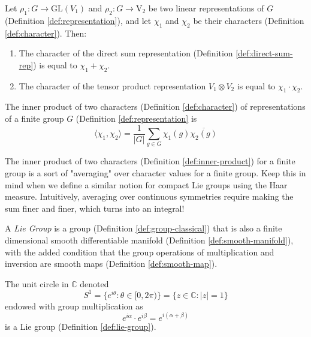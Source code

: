 \begin{proposition}
  Let $\rho_1 : G \to \mathrm{GL}(V_1)$ and $\rho_2 : G \to \mathrm{V_2}$ be two linear representations of $G$ (Definition \ref{def:representation}), and let $\chi_1$ and $\chi_2$ be their characters (Definition \ref{def:character}).
  Then:
  \begin{enumerate}
    \item The character of the direct sum representation (Definition \ref{def:direct-sum-rep}) is equal to $\chi_1 + \chi_2$.
    \item The character of the tensor product representation $V_1 \otimes V_2$ is equal to $\chi_1 \cdot \chi_2$.
  \end{enumerate}
\end{proposition}

\begin{definition}
  \label{def:inner-product}
  The inner product of two characters (Definition \ref{def:character}) of representations of a finite group $G$ (Definition \ref{def:representation} is
  \[
    \langle \chi_1, \chi_2 \rangle = \frac{1}{|G|}\sum_{g \in G} \chi_1 (g) \overline{\chi_2(g)}
  \]

  \begin{remark}
    The inner product of two characters (Definition \ref{def:inner-product}) for a finite group is a sort of "averaging" over character values
    for a finite group. Keep this in mind when we define a similar notion for compact Lie groups using the Haar measure. Intuitively, averaging
    over continuous symmetries require making the sum finer and finer, which turns into an integral!
  \end{remark}

\end{definition}

\begin{definition}
  \label{def:lie-group}
  A \emph{Lie Group} is a group (Definition \ref{def:group-classical}) that is also a finite dimensional smooth differentiable manifold (Definition \ref{def:smooth-manifold}), with the added
  condition that the group operations of multiplication and inversion are smooth maps (Definition \ref{def:smooth-map}).
\end{definition}

\begin{example}
  \label{example:S1}

The unit circle in $\mathbb{C}$ denoted $$S^1 = \{e^{i\theta} \colon \theta \in [0,2\pi)\} = \{z \in \mathbb{C}\colon |z|= 1\}$$ endowed with group multiplication as
  \[
    e^{i\alpha} \cdot e^{i\beta} = e^{i(\alpha+\beta)}
  \]
  is a Lie group (Definition \ref{def:lie-group}).
\end{example}

